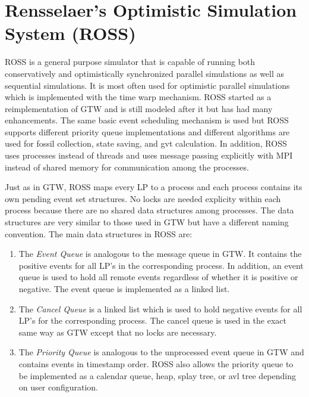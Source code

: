 \documentclass[11pt]{book}
\begin{document}
\section{Rensselaer's Optimistic Simulation System (ROSS)}

ROSS\cite{carothers-00} is a general purpose simulator that is capable of running both
conservatively and optimistically synchronized parallel simulations as well as sequential
simulations. It is most often used for optimistic parallel simulations which is implemented
with the time warp mechanism. ROSS started as a reimplementation of GTW and is still
modeled after it but has had many enhancements. The same basic event scheduling mechanism is
used but ROSS supports different priority queue implementations and different algorithms
are used for fossil collection, state saving, and gvt calculation. In addition, ROSS uses
processes instead of threads and uses message passing explicitly with MPI instead of shared
memory for communication among the processes.

Just as in GTW, ROSS maps every LP to a process and each process contains its own pending
event set structures. No locks are needed explicity within each process because there are
no shared data structures among processes. The data structures are very similar to those
used in GTW but have a different naming convention. The main data structures in ROSS are:

\begin{enumerate}
    \item The \emph{Event Queue} is analogous to the message queue in GTW. It contains the
        positive events for all LP's in the corresponding process. In addition, an event
        queue is used to hold all remote events regardless of whether it is positive or
        negative. The event queue is implemented as a linked list.
    \item The \emph{Cancel Queue} is a linked list which is used to hold negative events
        for all LP's for the corresponding process. The cancel queue is used in the exact
        same way as GTW except that no locks are necessary.
    \item The \emph{Priority Queue} is analogous to the unprocessed event queue in GTW and
        contains events in timestamp order. ROSS also allows the priority queue to be
        implemented as a calendar queue, heap, splay tree, or avl tree depending on user
        configuration.
\end{enumerate}
\end{document}
